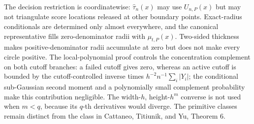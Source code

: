 The decision restriction is coordinatewise: \(\widehat\tau_n(x)\) may use \(U_{n,P}(x)\) but may not triangulate score locations released at other boundary points.  Exact-radius conditionals are determined only almost everywhere, and the canonical representative fills zero-denominator radii with \(\mu_{t,P}(x)\).  Two-sided thickness makes positive-denominator radii accumulate at zero but does not make every circle positive.  The local-polynomial proof controls the concentration complement on both cutoff branches: a failed cutoff gives zero, whereas an active cutoff is bounded by the cutoff-controlled inverse times \(h^{-2}n^{-1}\sum_i|Y_i|\); the conditional sub-Gaussian second moment and a polynomially small complement probability make this contribution negligible.  The width-\(h\), height-\(h^m\) converse is not used when \(m<q\), because its \(q\)-th derivatives would diverge.  The primitive classes remain distinct from the class in Cattaneo, Titiunik, and Yu, Theorem 6.